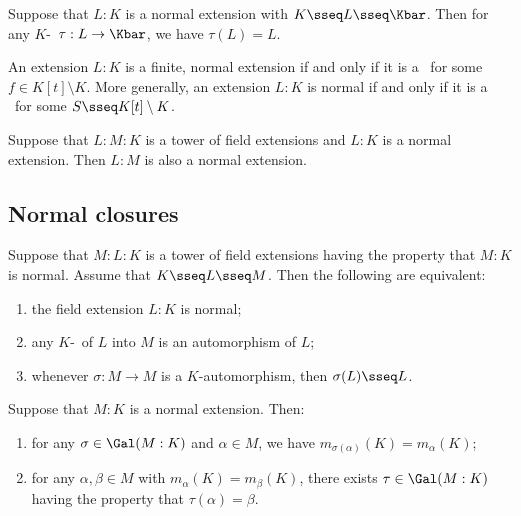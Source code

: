 \documentclass{article}
\begin{document}
  \begin{tproposition}
    Suppose that \( L:K \) is a normal extension with \( K\sseq L\sseq \Kbar \).
    Then for any \( K \)-\homo~\( \tau:L\to \Kbar \), we have \( \tau(L) = L \).
  \end{tproposition}

  \begin{tproposition}
    An extension \( L:K \) is a finite, normal extension if and only if it is a \sfe~for some \( f\in K[t]\setminus K \).
    More generally, an extension \( L:K \) is normal if and only if it is a \sfe~for some \( S\sseq K[t]\setminus K \).
  \end{tproposition}

  \begin{tproposition}
    Suppose that \( L:M:K \) is a tower of field extensions and \( L:K \) is a normal extension.
    Then \( L:M \) is also a normal extension.
  \end{tproposition}

\subsection{Normal closures}
  \begin{ttheorem}
    Suppose that \( M:L:K \) is a tower of field extensions having the property that \( M:K \) is normal.
    Assume that \( K\sseq L\sseq M \).
    Then the following are equivalent: \begin{enumerate}[label=(\roman*)]
      \item the field extension \( L:K \) is normal;
      \item any \( K \)-\homo~of \( L \) into \( M \) is an automorphism of \( L \);
      \item whenever \( \sigma:M\to M \) is a \( K \)-automorphism, then \( \sigma(L)\sseq L \).
    \end{enumerate}
  \end{ttheorem}

  \begin{tproposition}
    Suppose that \( M:K \) is a normal extension.
    Then: \begin{enumerate}[label=(\alph*)]
      \item for any \( \sigma\in\Gal(M:K) \) and \( \alpha\in M \), we have \( m_{\sigma(\alpha)}(K)=m_\alpha(K) \);
      \item for any \( \alpha,\beta\in M \) with \( m_\alpha(K)=m_\beta(K) \), there exists \( \tau\in\Gal(M:K) \) having the property that \( \tau(\alpha)=\beta \).
    \end{enumerate}
  \end{tproposition}
\end{document}

